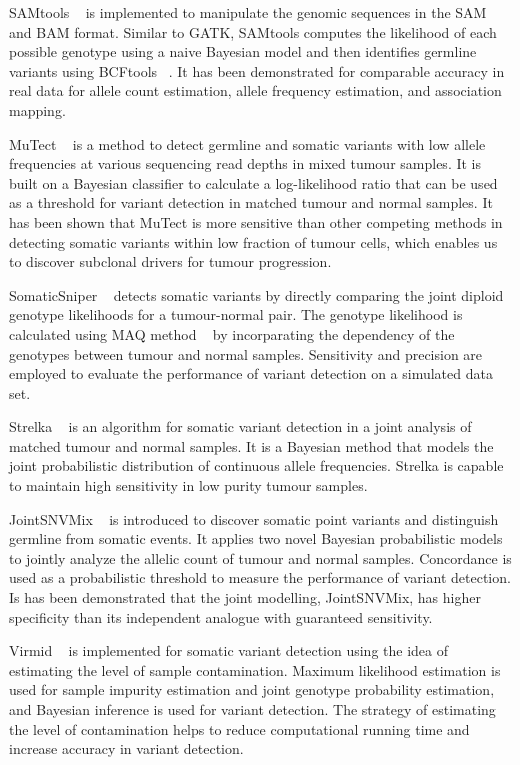 \documentclass[11pt,reqno]{amsart}
\begin{document}
SAMtools ~\citep{Li2009a} is implemented to manipulate the genomic sequences in the SAM and BAM format.
Similar to GATK, SAMtools computes the likelihood of each possible genotype using a naive Bayesian model and then identifies germline variants using BCFtools ~\citep{li2011statistical}.
It has been demonstrated for comparable accuracy in real data for allele count estimation, allele frequency estimation, and association mapping.

MuTect ~\citep{Cibulskis2013} is a method to detect germline and somatic variants with low allele frequencies at various sequencing read depths in mixed tumour samples.
It is built on a Bayesian classifier to calculate a log-likelihood ratio that can be used as a threshold for variant detection in matched tumour and normal samples.
It has been shown that MuTect is more sensitive than other competing methods in detecting somatic variants within low fraction of tumour cells, which enables us to discover subclonal drivers for tumour progression.

SomaticSniper ~\citep{Larson2012} detects somatic variants by directly comparing the joint diploid genotype likelihoods for a tumour-normal pair.
The genotype likelihood is calculated using MAQ method ~\citep{Li2008} by  incorparating the dependency of the genotypes between tumour and normal samples.
Sensitivity and precision are employed to evaluate the performance of variant detection on a simulated data set.

Strelka ~\citep{Saunders2012} is an algorithm for somatic variant detection in a joint analysis of matched tumour and normal samples.
It is a Bayesian method that models the joint probabilistic distribution of continuous allele frequencies.
Strelka is capable to maintain high sensitivity in low purity tumour samples.

JointSNVMix ~\citep{Roth2012} is introduced to discover somatic point variants and distinguish germline from somatic events.
It applies two novel Bayesian probabilistic models to jointly analyze the allelic count of tumour and normal samples.
Concordance is used as a probabilistic threshold to measure the performance of variant detection.
Is has been demonstrated that the joint modelling, JointSNVMix, has higher specificity than its independent analogue with guaranteed sensitivity.

Virmid ~\citep{Kim2013} is implemented for somatic variant detection using the idea of estimating the level of sample contamination.
Maximum likelihood estimation is used for sample impurity estimation and joint genotype probability estimation, and Bayesian inference is used for variant detection.
The strategy of estimating the level of contamination helps to reduce computational running time and increase accuracy in variant detection.
\end{document}
